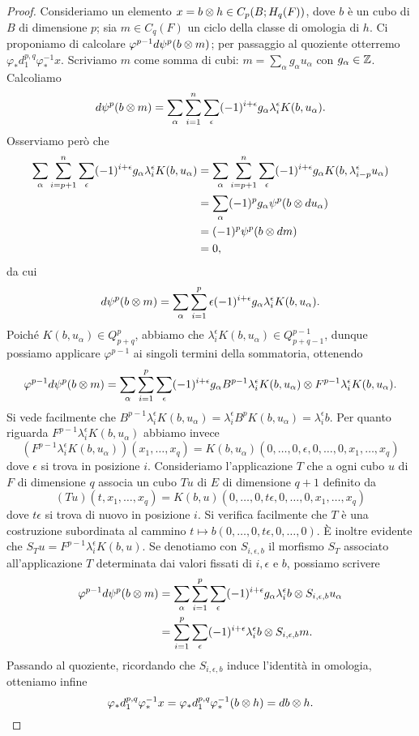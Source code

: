 \begin{proof}
Consideriamo un elemento $x=b\mathbin{\otimes} h\in C_p(B;H_q(F))$, dove $b$ è un cubo di $B$ di dimensione $p$; sia $m\in C_q(F)$ un ciclo della classe di omologia di $h$. Ci proponiamo di calcolare $\varphi^{p-1}d\psi^p(b\mathbin{\otimes} m)$; per passaggio al quoziente otterremo $\varphi_*d^{p,q}_1\varphi_*^{-1}x$. Scriviamo $m$ come somma di cubi: $m=\sum_{\alpha}g_\alpha u_\alpha$ con $g_\alpha\in\mathbb{Z}$. Calcoliamo
$$
d\psi^p(b\mathbin{\otimes} m)=\sum_\alpha\sum_{i=1}^n\sum_\epsilon(-1)^{i+\epsilon}g_\alpha\lambda^\epsilon_iK(b,u_\alpha).
$$
Osserviamo però che
\begin{align*}
\sum_\alpha\sum_{i=p+1}^n\sum_\epsilon(-1)^{i+\epsilon}g_\alpha\lambda^\epsilon_iK(b,u_\alpha)&=\sum_{\alpha}\sum_{i=p+1}^n\sum_\epsilon(-1)^{i+\epsilon}g_\alpha K(b,\lambda^\epsilon_{i-p}u_\alpha)\\
&=\sum_\alpha(-1)^pg_\alpha\psi^p(b\mathbin{\otimes} du_\alpha)\\
&=(-1)^p\psi^p(b\mathbin{\otimes} dm)\\
&=0,
\end{align*}
da cui
$$
d\psi^p(b\mathbin{\otimes} m)=\sum_\alpha\sum_{i=1}^p\epsilon(-1)^{i+\epsilon}g_\alpha\lambda^\epsilon_iK(b,u_\alpha).
$$
Poiché $K(b,u_\alpha)\in Q^p_{p+q}$, abbiamo che $\lambda^\epsilon_iK(b,u_\alpha)\in Q^{p-1}_{p+q-1}$, dunque possiamo applicare $\varphi^{p-1}$ ai singoli termini della sommatoria, ottenendo
$$
\varphi^{p-1}d\psi^p(b\mathbin{\otimes} m)=\sum_\alpha\sum_{i=1}^p\sum_\epsilon(-1)^{i+\epsilon}g_\alpha B^{p-1}\lambda^\epsilon_iK(b,u_\alpha)\mathbin{\otimes} F^{p-1}\lambda^\epsilon_iK(b,u_\alpha).
$$
Si vede facilmente che $B^{p-1}\lambda^{\epsilon}_iK(b,u_\alpha)=\lambda^\epsilon_i B^pK(b,u_\alpha)=\lambda^\epsilon_ib$. Per quanto riguarda $F^{p-1}\lambda^\epsilon_iK(b,u_\alpha)$ abbiamo invece
$$
(F^{p-1}\lambda^\epsilon_iK(b,u_\alpha))(x_1,\ldots,x_q)=K(b,u_\alpha)(0,\ldots,0,\epsilon,0,\ldots,0,x_1,\ldots,x_q)
$$
dove $\epsilon$ si trova in posizione $i$. Consideriamo l'applicazione $T$ che a ogni cubo $u$ di $F$ di dimensione $q$ associa un cubo $Tu$ di $E$ di dimensione $q+1$ definito da
$$
(Tu)(t,x_1,\ldots,x_q)=K(b,u)(0,\ldots,0,t\epsilon,0,\ldots,0,x_1,\ldots,x_q)
$$
dove $t\epsilon$ si trova di nuovo in posizione $i$. Si verifica facilmente che $T$ è una costruzione subordinata al cammino $t\mapsto b(0,\ldots,0,t\epsilon,0,\ldots,0)$. È inoltre evidente che $S_Tu=F^{p-1}\lambda^\epsilon_iK(b,u)$. Se denotiamo con $S_{i,\epsilon,b}$ il morfismo $S_T$ associato all'applicazione $T$ determinata dai valori fissati di $i,\epsilon$ e $b$, possiamo scrivere
\begin{align*}
\varphi^{p-1}d\psi^p(b\mathbin{\otimes} m)&=\sum_\alpha\sum_{i=1}^p\sum_\epsilon(-1)^{i+\epsilon}g_\alpha\lambda^\epsilon_ib\mathbin{\otimes} S_{i,\epsilon,b}u_\alpha\\
&=\sum_{i=1}^p\sum_\epsilon(-1)^{i+\epsilon}\lambda^\epsilon_ib\mathbin{\otimes} S_{i,\epsilon,b}m.
\end{align*}
Passando al quoziente, ricordando che $S_{i,\epsilon, b}$ induce l'identità in omologia, otteniamo infine
$$
\varphi_*d^{p,q}_1\varphi_*^{-1}x=\varphi_*d^{p,q}_1\varphi_*^{-1}(b\mathbin{\otimes} h)=db\mathbin{\otimes} h.
$$
\end{proof}
